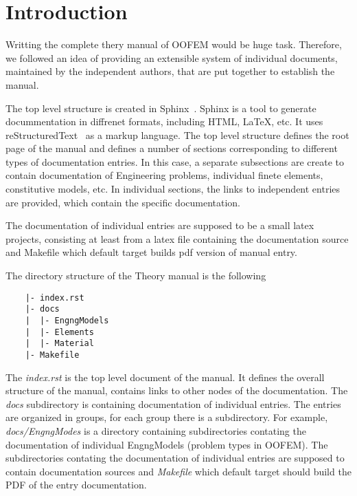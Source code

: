 \documentclass[11pt]{article}
\begin{document}
\section{Introduction}
Writting the complete thery manual of OOFEM would be huge task. Therefore, we followed an idea of providing an extensible system of individual documents, maintained by the independent authors, that are put together to establish the manual.

The top level structure is created in Sphinx~\cite{Sphinx}. Sphinx is a tool to generate docummentation in diffrenet formats, including HTML, LaTeX, etc. It uses reStructuredText~\cite{reStructuredText} as a markup language. The top level structure defines the root page of the manual and defines a number of sections corresponding to different types of documentation entries. In this case, a separate subsections are create to contain documentation of Engineering problems, individual finete elements, constitutive models, etc. In individual sections, the links to independent entries are provided, which contain the specific documentation. 

The documentation of individual entries are supposed to be a small latex projects, consisting at least from a latex file containing the documentation source and Makefile which default target builds pdf version of manual entry.

The directory structure of the Theory manual is the following
\begin{verbatim}
    |- index.rst      
    |- docs           
    |  |- EngngModels 
    |  |- Elements    
    |  |- Material    
    |- Makefile      
\end{verbatim}
The {\em index.rst} is the top level document of the manual. It defines the overall structure of the manual, contains links to other nodes of the documentation. The {\em docs} subdirectory is containing documentation of individual entries. The entries are organized in groups, for each group there is a subdirectory. For example, {\em docs/EngngModes} is a directory containing subdirectories contating the documentation of individual EngngModels (problem types in OOFEM). The subdirectories contating the documentation of individual entries are supposed to contain documentation sources and {\em Makefile} which default target should build the PDF of the entry documentation. 
\end{document}
